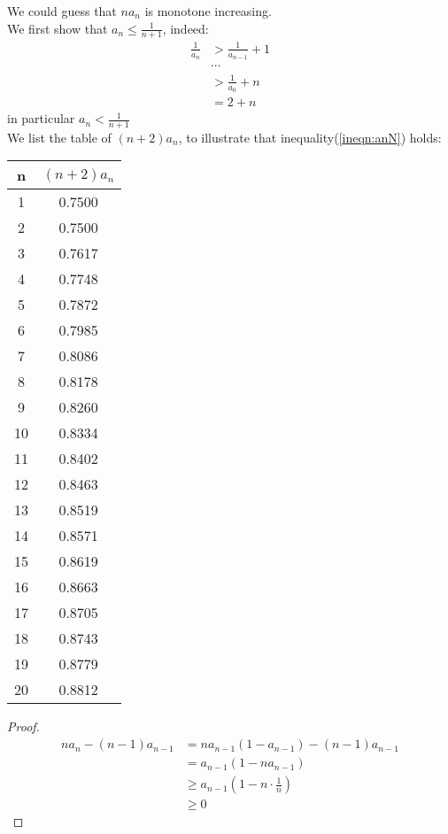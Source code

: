 \documentclass{article}
\begin{document}
We could guess that $na_n$ is monotone increasing. \\
We first show that $a_n \leq \frac{1}{n + 1}$, indeed:
\begin{align*}
	\frac{1}{a_n} &> \frac{1}{a_{n-1}} + 1 \\
		&\cdots\\
		&> \frac{1}{a_0} + n\\
		&= 2 + n  \tag{*} \label{ineqn:anN}
\end{align*}
in particular $a_n  < \frac{1}{n+1}$\\
We list the table of $(n+2)a_n$, to illustrate that inequality(\ref{ineqn:anN}) holds:
\begin{center}
	\begin{tabular}{||c c||} 
 \hline
 n & $(n+2)a_n$\\ [0.5ex] 
  \hline\hline
 1 & 0.7500\\
  2 & 0.7500\\
  3 & 0.7617\\
  4 & 0.7748\\
  5 & 0.7872\\
  6 & 0.7985\\
  7 & 0.8086\\
  8 & 0.8178\\
  9 & 0.8260\\
 10 & 0.8334\\
 11 & 0.8402\\
 12 & 0.8463\\
 13 & 0.8519\\
 14 & 0.8571\\
 15 & 0.8619\\
 16 & 0.8663\\
 17 & 0.8705\\
 18 & 0.8743\\
 19 & 0.8779\\
 20 & 0.8812\\[1ex] 
 \hline
\end{tabular}
\end{center}

\begin{proof}
	\begin{align*}
		na_n - (n-1)a_{n-1} &= n a_{n-1} (1 - a_{n-1}) - (n-1)a_{n-1}\\
					&= a_{n-1}(1 - na_{n-1}) \\
					&\geq a_{n-1}(1- n \cdot \frac{1}{n}) \\
					&\geq 0
	\end{align*}
\end{proof}
\end{document}
